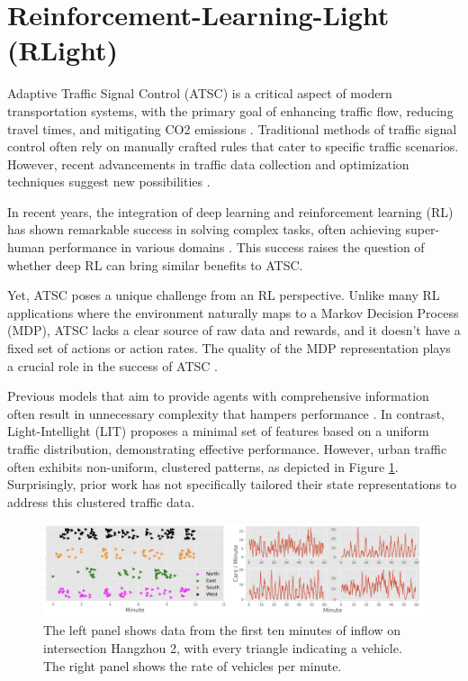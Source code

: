 \section{Reinforcement-Learning-Light (RLight)}
Adaptive Traffic Signal Control (ATSC) is a critical aspect of modern transportation systems, with the primary goal of enhancing traffic flow, reducing travel times, and mitigating CO2 emissions \cite{zhao2011computational}. Traditional methods of traffic signal control often rely on manually crafted rules that cater to specific traffic scenarios. However, recent advancements in traffic data collection and optimization techniques suggest new possibilities \cite{wei2019survey}.

In recent years, the integration of deep learning and reinforcement learning (RL) has shown remarkable success in solving complex tasks, often achieving super-human performance in various domains \cite{hernandez2019survey, mnih2015human, silver2018general}. This success raises the question of whether deep RL can bring similar benefits to ATSC.

Yet, ATSC poses a unique challenge from an RL perspective. Unlike many RL applications where the environment naturally maps to a Markov Decision Process (MDP), ATSC lacks a clear source of raw data and rewards, and it doesn't have a fixed set of actions or action rates. The quality of the MDP representation plays a crucial role in the success of ATSC \cite{zheng2019diagnosing}.

Previous models that aim to provide agents with comprehensive information often result in unnecessary complexity that hampers performance \cite{zheng2019diagnosing}. In contrast, Light-Intellight (LIT) \cite{zheng2019diagnosing} proposes a minimal set of features based on a uniform traffic distribution, demonstrating effective performance. However, urban traffic often exhibits non-uniform, clustered patterns, as depicted in Figure \ref{fig:atsc_clustering}. Surprisingly, prior work has not specifically tailored their state representations to address this clustered traffic data.

\begin{figure}[h]
    \centering
    \includegraphics[width=1\linewidth]{images/related_work/atsc_representation.png}
    \caption{The left panel shows data from the first ten minutes of inflow on intersection Hangzhou 2, with every triangle indicating a vehicle. The right panel shows the rate of vehicles per minute. \cite{kanis2021deep}}
    \label{fig:atsc_clustering}
\end{figure}

